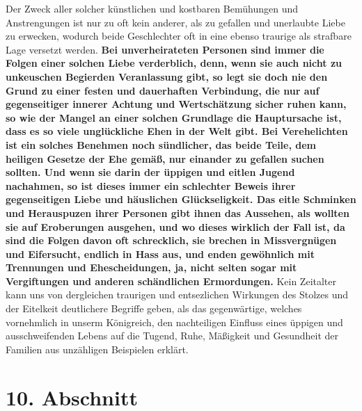 Der Zweck aller solcher künstlichen und kostbaren Bemühungen und Anstrengungen
ist nur zu oft kein anderer, als zu gefallen und unerlaubte Liebe zu erwecken,
wodurch beide Geschlechter oft in eine ebenso traurige als strafbare Lage
versetzt werden. 
\label{ref:11_09_kaputte_ehen} \textbf{Bei
unverheirateten Personen sind immer die Folgen einer
solchen Liebe verderblich, denn, wenn sie auch nicht zu unkeuschen Begierden
Veranlassung gibt, so legt sie doch nie den Grund zu einer festen und
dauerhaften Verbindung, die nur auf gegenseitiger innerer Achtung und
Wertschätzung sicher ruhen kann, so wie der Mangel an einer solchen Grundlage
die Hauptursache ist, dass es so viele unglückliche Ehen in der Welt gibt. Bei
Verehelichten ist ein solches Benehmen noch sündlicher, das beide Teile, dem
heiligen Gesetze der Ehe gemäß, nur einander zu gefallen suchen sollten. Und
wenn sie darin der üppigen und eitlen Jugend nachahmen, so ist dieses immer ein
schlechter Beweis ihrer gegenseitigen Liebe und häuslichen Glückseligkeit. Das
eitle Schminken und Herauspuzen ihrer Personen gibt ihnen das Aussehen, als
wollten sie auf Eroberungen ausgehen, und wo dieses wirklich der Fall ist, da
sind die Folgen davon oft schrecklich, sie brechen in Missvergnügen und
Eifersucht, endlich in Hass aus, und enden gewöhnlich mit Trennungen und
Ehescheidungen, ja, nicht selten sogar mit Vergiftungen und anderen schändlichen
Ermordungen.} Kein Zeitalter kann uns von dergleichen traurigen und entsezlichen
Wirkungen des Stolzes und der Eitelkeit deutlichere Begriffe geben, als das
gegenwärtige, welches vornehmlich in unserm Königreich, den nachteiligen
Einfluss eines üppigen und ausschweifenden Lebens auf die Tugend, Ruhe,
Mäßigkeit
und Gesundheit der Familien aus unzähligen Beispielen erklärt.

\section{10. Abschnitt} \label{kap11_ab10}

